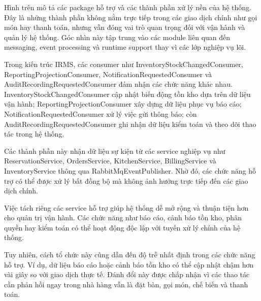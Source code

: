 Hình trên mô tả các package hỗ trợ và các thành phần xử lý nền của hệ thống. Đây là những thành phần không nằm trực tiếp trong các giao dịch chính như gọi món hay thanh toán, nhưng vẫn đóng vai trò quan trọng đối với vận hành và quản lý hệ thống. Góc nhìn này tập trung vào các module liên quan đến messaging, event processing và runtime support thay vì các lớp nghiệp vụ lõi.

Trong kiến trúc IRMS, các consumer như \textsf{InventoryStockChangedConsumer}, \textsf{ReportingProjectionConsumer}, \textsf{NotificationRequestedConsumer} và \textsf{AuditRecordingRequestedConsumer} đảm nhận các chức năng khác nhau. \textsf{InventoryStockChangedConsumer} cập nhật biến động tồn kho dựa trên dữ liệu vận hành; \textsf{ReportingProjectionConsumer} xây dựng dữ liệu phục vụ báo cáo; \textsf{NotificationRequestedConsumer} xử lý việc gửi thông báo; còn \textsf{AuditRecordingRequestedConsumer} ghi nhận dữ liệu kiểm toán và theo dõi thao tác trong hệ thống.

Các thành phần này nhận dữ liệu sự kiện từ các service nghiệp vụ như \textsf{ReservationService}, \textsf{OrdersService}, \textsf{KitchenService}, \textsf{BillingService} và \textsf{InventoryService} thông qua \textsf{RabbitMqEventPublisher}. Nhờ đó, các chức năng hỗ trợ có thể được xử lý bất đồng bộ mà không ảnh hưởng trực tiếp đến các giao dịch chính.

Việc tách riêng các service hỗ trợ giúp hệ thống dễ mở rộng và thuận tiện hơn cho quản trị vận hành. Các chức năng như báo cáo, cảnh báo tồn kho, phân quyền hay kiểm toán có thể hoạt động độc lập với tuyến xử lý chính của hệ thống.

Tuy nhiên, cách tổ chức này cũng dẫn đến độ trễ nhất định trong các chức năng hỗ trợ. Ví dụ, dữ liệu báo cáo hoặc cảnh báo tồn kho có thể cập nhật chậm hơn vài giây so với giao dịch thực tế. Đánh đổi này được chấp nhận vì các thao tác cần phản hồi ngay trong nhà hàng vẫn là đặt bàn, gọi món, chế biến và thanh toán.
